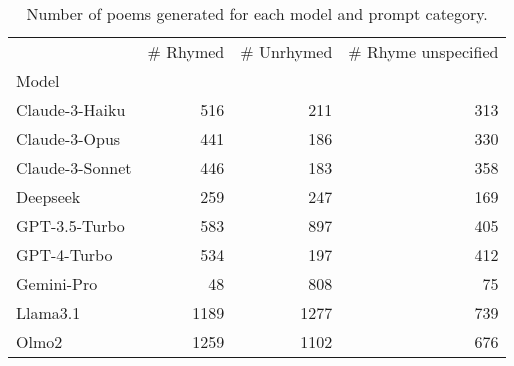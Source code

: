 \begin{table}[H]
  \centering
  \small
  \singlespacing
  \begin{tabular}{lrrr}
  \toprule
   & \# Rhymed & \# Unrhymed & \# Rhyme unspecified \\
  Model &  &  &  \\
  \midrule
  Claude-3-Haiku & 516 & 211 & 313 \\
  Claude-3-Opus & 441 & 186 & 330 \\
  Claude-3-Sonnet & 446 & 183 & 358 \\
  Deepseek & 259 & 247 & 169 \\
  GPT-3.5-Turbo & 583 & 897 & 405 \\
  GPT-4-Turbo & 534 & 197 & 412 \\
  Gemini-Pro & 48 & 808 & 75 \\
  Llama3.1 & 1189 & 1277 & 739 \\
  Olmo2 & 1259 & 1102 & 676 \\
  \bottomrule
  \end{tabular}
  \caption{Number of poems generated for each model and prompt category.}
  \label{tab:num_poems_models}
\end{table}
